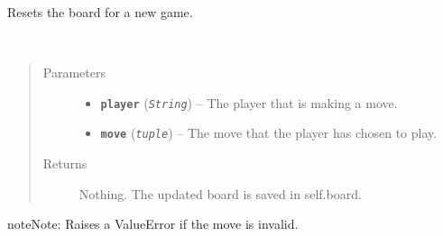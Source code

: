 \documentclass[letterpaper,10pt,english]{sphinxmanual}
\begin{document}
\begin{fulllineitems}
\begin{fulllineitems}
\end{fulllineitems}


\begin{fulllineitems}
\label{index:GameEngine.GameEngine.resetBoard}
Resets the board for a new game.

\end{fulllineitems}


\begin{fulllineitems}
\label{index:GameEngine.GameEngine.updateBoard}~\begin{quote}\begin{description}
\item[{Parameters}] \leavevmode\begin{itemize}
\item {} 
\textbf{\texttt{player}} (\emph{\texttt{String}}) -- The player that is making a move.

\item {} 
\textbf{\texttt{move}} (\emph{\texttt{tuple}}) -- The move that the player has chosen to play.

\end{itemize}

\item[{Returns}] \leavevmode
Nothing. The updated board is saved in self.board.

\end{description}\end{quote}

\begin{notice}{note}{Note:}
Raises a ValueError if the move is invalid.
\end{notice}

\end{fulllineitems}


\end{fulllineitems}

\label{index:module-Player}
\end{document}
